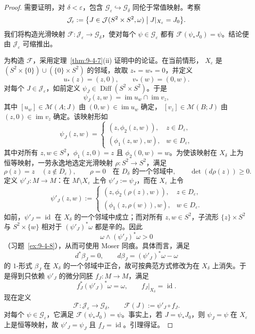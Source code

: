 \begin{proof}
需要证明，对 $\delta<\varepsilon$，包含
$\mathcal G_\varepsilon\hookrightarrow\mathcal G_\delta$ 同伦于常值映射。考察
\[
  \mathcal J_\varepsilon
  :=\bigl\{J\in\mathcal J(S^2\times S^2,\omega)
  \bigm|J|_{X_\varepsilon}=J_0\bigr\}.
\]
我们将构造光滑映射
$\mathcal F:\mathcal J_\varepsilon\to\mathcal G_\delta$，使对每个
$\psi\in\mathcal G_\varepsilon$ 都有
$\mathcal F(\psi_*J_0)=\psi$。结论便由 $\mathcal J_\varepsilon$ 可缩推出。

为构造 $\mathcal F$，采用定理~\ref{thm:9-4-7}(ii) 证明中的论证。在当前情形，
$X_\varepsilon$ 是
$(S^2\times\{0\})\cup(\{0\}\times S^2)$ 的邻域，故取 $z_*=w_*=0$，并定义
\[
  u_*(z)=(z,0),
  \qquad v_*(w)=(0,w).
\]
对每个 $J\in\mathcal J_\varepsilon$，如前定义
$\psi_J\in\operatorname{Diff}(S^2\times S^2)$。于是
\[
  \psi_J(z,w)=\operatorname{im}u_w\cap\operatorname{im}v_z,
\]
其中 $[u_w]\in\mathcal M(A;J)$ 由 $(0,w)\in\operatorname{im}u_w$ 确定，
$[v_z]\in\mathcal M(B;J)$ 由 $(z,0)\in\operatorname{im}v_z$ 确定。该映射形如
\[
  \psi_J(z,w)=
  \begin{cases}
    (z,\phi_2(z,w)),&z\in D_\varepsilon,\\
    (\phi_1(z,w),w),&w\in D_\varepsilon,
  \end{cases}
\]
其中对所有 $z,w\in S^2$，$\phi_1(z,0)=z$ 且 $\phi_2(0,w)=w$。为使该映射在
$X_\delta$ 上为恒等映射，一劳永逸地选定光滑映射 $\rho:S^2\to S^2$，满足
\[
  \rho(z)=z\quad(z\notin D_\varepsilon),
  \qquad \rho=0\quad\text{在 $D_\delta$ 的一个邻域中},
  \qquad \det(d\rho(z))\ge0.
\]
定义 $\psi'_J:M\to M$：在 $M\setminus X_\varepsilon$ 上令
$\psi'_J:=\psi_J$，而在 $X_\varepsilon$ 上令
\[
  \psi'_J(z,w):=
  \begin{cases}
    (z,\phi_2(\rho(z),w)),&z\in D_\varepsilon,\\
    (\phi_1(z,\rho(w)),w),&w\in D_\varepsilon.
  \end{cases}
\]
如前，$\psi'_J=\operatorname{id}$ 在 $X_\delta$ 的一个邻域中成立；而对所有
$z,w\in S^2$，子流形 $\{z\}\times S^2$ 与 $S^2\times\{w\}$ 相对于
$(\psi'_J)^*\omega$ 都是辛的。因此
\[
  \omega\wedge(\psi'_J)^*\omega>0
\]
（习题~\ref{ex:9-4-8}），从而可使用 Moser 同痕。具体而言，满足
\[
  d^*\beta_J=0,
  \qquad d\beta_J=(\psi'_J)^*\omega-\omega
\]
的 $1$-形式 $\beta_J$ 在 $X_\delta$ 的一个邻域中正合，故可按典范方式修改为在
$X_\delta$ 上消失。于是得到只依赖 $\psi'_J$ 的微分同胚 $f_J:M\to M$，满足
\[
  f_J^*(\psi'_J)^*\omega=\omega,
  \qquad f_J|_{X_\delta}=\operatorname{id}.
\]
现在定义
\[
  \mathcal F:\mathcal J_\varepsilon\longrightarrow\mathcal G_\delta,
  \qquad \mathcal F(J):=\psi'_J\circ f_J.
\]
对每个 $\psi\in\mathcal G_\varepsilon$，它满足
$\mathcal F(\psi_*J_0)=\psi$。事实上，若 $J=\psi_*J_0$，则
$\psi_J=\psi$ 在 $X_\varepsilon$ 上是恒等映射，故
$\psi'_J=\psi_J$ 且 $f_J=\operatorname{id}$。引理得证。
\end{proof}

